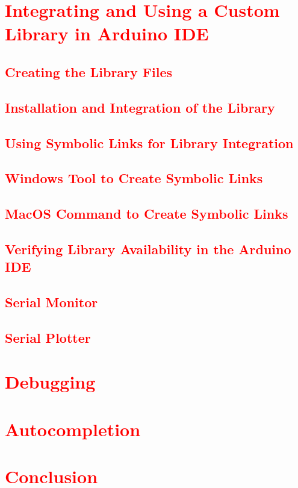 \section{\textcolor{red}{Integrating and Using a Custom Library in Arduino IDE}}
	
\subsection{\textcolor{red}{Creating the Library Files}} 

\subsection{\textcolor{red}{Installation and Integration of the Library}}
		
\subsection{\textcolor{red}{Using Symbolic Links for Library Integration}}

\subsection{\textcolor{red}{Windows Tool  to Create Symbolic Links}}

\subsection{\textcolor{red}{MacOS Command  to Create Symbolic Links}}
	
\subsection{\textcolor{red}{Verifying Library Availability in the Arduino IDE}}

\subsection{\textcolor{red}{Serial Monitor}}
	
\subsection{\textcolor{red}{Serial Plotter}}

\section{\textcolor{red}{Debugging}}

\section{\textcolor{red}{Autocompletion}}

\section{\textcolor{red}{Conclusion}}

	
